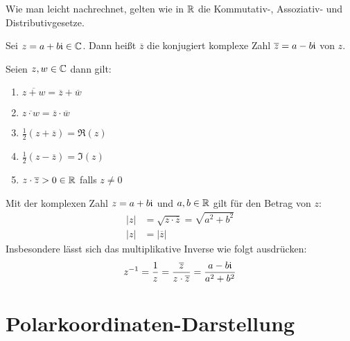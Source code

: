 \bemerkung
Wie man leicht nachrechnet, gelten wie in $\mathbb{R}$ die Kommutativ-, Assoziativ- und Distributivgesetze.

Sei $z=a+b\mathfrak{i}\in\mathbb{C}$. Dann heißt $\overline z$ die konjugiert komplexe Zahl $\overline z=a-b\mathfrak{i}$ von $z$.

Seien $z,w\in\mathbb{C}$ dann gilt:
\begin{enumerate}
  \item $\overline{z+w}=\overline z+\overline w$
  \item $\overline{z\cdot w}=\overline z \cdot \overline w$
  \item $\frac 1 2 (z+\overline z)=\Re(z)$
  \item $\frac 1 2 (z-\overline z)=\Im(z)$
  \item $z\cdot \overline z > 0 \in\mathbb{R}$ falls $z\neq0$
\end{enumerate}

Mit der komplexen Zahl $z=a+b\mathfrak{i}$ und $a,b\in\mathbb{R}$ gilt für den Betrag von $z$:
\begin{align*}
  |z|&=\sqrt{z\cdot\overline z}=\sqrt{a^2+b^2}\\
  |z|&=|\overline z|
\end{align*}
Insbesondere lässt sich das multiplikative Inverse wie folgt ausdrücken:
\begin{equation*}
  z^{-1}=\frac 1 z=\frac{\overline z}{z\cdot\overline z}=\frac{a-b\mathfrak{i}}{a^2+b^2}
\end{equation*}

\section{Polarkoordinaten-Darstellung}
